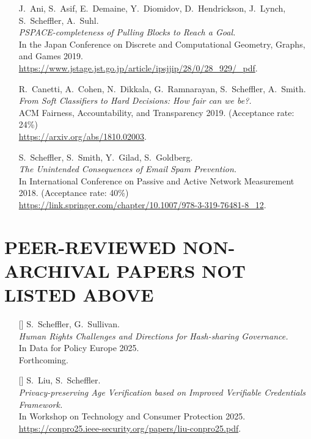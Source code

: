 \documentclass{res}
\begin{document}
\begin{resume}
\begin{itemize}
\item[\pullingblocks] J.~Ani, S.~Asif, E.~Demaine, Y.~Diomidov, D.~Hendrickson, J.~Lynch, S.~Scheffler, A.~Suhl. \\
\emph{PSPACE-completeness of Pulling Blocks to Reach a Goal.}  \\
In the Japan Conference on Discrete and Computational Geometry, Graphs, and Games 2019. \\
\url{https://www.jstage.jst.go.jp/article/ipsjjip/28/0/28_929/_pdf}.

\item[\fairsibility] R.~Canetti, A.~Cohen, N.~Dikkala, G.~Ramnarayan, S.~Scheffler, A.~Smith. \\
\emph{From Soft Classifiers to Hard Decisions: How fair can we be?.} \\
ACM Fairness, Accountability, and Transparency 2019. (Acceptance rate: 24\%) \\
\url{https://arxiv.org/abs/1810.02003}.

\item[\emailspam] S.~Scheffler, S.~Smith, Y.~Gilad, S.~Goldberg. \\
\emph{The Unintended Consequences of Email Spam Prevention.} \\
In International Conference on Passive and Active Network Measurement 2018. (Acceptance rate: 40\%) \\
\url{https://link.springer.com/chapter/10.1007/978-3-319-76481-8\_12}.
\end{itemize}

\section{PEER-REVIEWED NON-ARCHIVAL PAPERS NOT LISTED ABOVE}
\vspace{0.25in}

\edef\dfpgifct{[\arabic{citctr}]}
\edef\conproageverif{[\arabic{citctr}]}

\begin{itemize}
\item[\dfpgifct] S.~Scheffler, G.~Sullivan. \\
\emph{Human Rights Challenges and Directions for Hash-sharing Governance.} \\
In Data for Policy Europe 2025. \\
Forthcoming.

\item[\conproageverif] S.~Liu, S.~Scheffler. \\
\emph{Privacy-preserving Age Verification based on Improved Verifiable Credentials Framework.} \\
In Workshop on Technology and Consumer Protection 2025. \\
\url{https://conpro25.ieee-security.org/papers/liu-conpro25.pdf}.
\end{itemize}




\end{resume}
\end{document}
